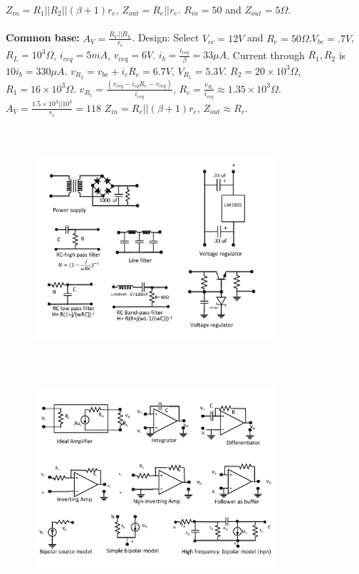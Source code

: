 $Z_{in} = R_1 || R_2 || (\beta+1)r_e$, $Z_{out} = R_e || r_e$.
$R_{in} = 50$ and $Z_{out} = 5 \Omega$.
\\
\\
{\bf Common base:}
$A_V= {\frac {R_C ||R_L} {r_e}}$.
Design: Select $V_{cc} = 12V$ and $R_e= 50 \Omega$,$V_{be}=.7V$,
$R_L=10^3 \Omega$, $i_{ceq} = 5 mA$, $v_{ceq}= 6V$.
$i_b={\frac {i_{ceq}} {\beta}}=33 \mu A$.  Current through
$R_1, R_2$ is $10 i_b= 330 \mu A$.  $v_{R_2}= v_{be} + i_c R_e = 6.7V$, $V_{R_1}= 5.3V$.
$R_2 = 20 \times 10^3 \Omega$, $R_1 = 16 \times 10^3 \Omega$.
$v_{R_c}= {\frac {(v_{ceq}- i_{cq} R_e -v_{ceq})} {i_{ceq}}}$,
$R_c = {\frac {v_{R_c}} {i_{ceq}}} \approx 1.35 \times 10^3 \Omega$.
$A_V= {\frac {1.5 \times 10^3 || 10^3} {r_e}}=118$
$Z_{in} = R_e || (\beta+1)r_e$, $Z_{out} \approx R_c$.
\\
\\
\begin{figure} 
\center
\includegraphics[width=0.8\textwidth,natwidth=642,natheight=610, height=80mm, width=88mm]{circuit1.pdf}
\end{figure}
\begin{figure} 
\center
\includegraphics[width=0.8\textwidth,natwidth=642,natheight=610, height=80mm, width=88mm]{circuit2.pdf}
\end{figure}
